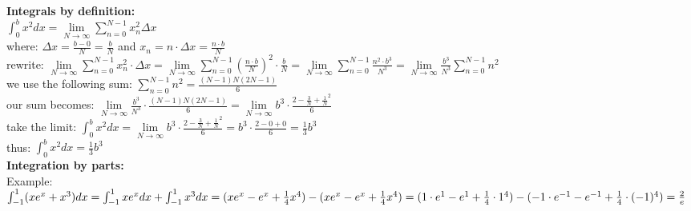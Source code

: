 \documentclass[12pt,a4paper]{report}
\begin{document}
	\textbf{Integrals by definition:}\\
	$\int_{0}^{b} x^2dx = \lim\limits_{N \to \infty} \sum_{n = 0}^{N - 1} x^2_n \Delta x$\\
	where:
	$\Delta x = \frac{b - 0}{N} = \frac{b}{N}$ and $x_n = n \cdot \Delta x = \frac{n \cdot b}{N}$\\
	rewrite:
	$\lim\limits_{N \to \infty}\sum_{n = 0}^{N - 1} x^2_n \cdot \Delta x = \lim\limits_{N \to \infty} \sum_{n = 0}^{N - 1} (\frac{n \cdot b}{N})^2 \cdot \frac{b}{N} = \lim\limits_{N \to \infty} \sum_{n = 0}^{N - 1} \frac{n^2 \cdot b^3}{N^3} = \lim\limits_{N \to \infty} \frac{b^3}{N^3} \sum_{n = 0}^{N - 1} n^2$\\
	we use the following sum:
	$\sum_{n = 0}^{N - 1} n^2 = \frac{(N-1)N(2N-1)}{6}$\\
	our sum becomes:
	$\lim\limits_{N \to \infty} \frac{b^3}{N^3} \cdot \frac{(N -1) N (2N - 1)}{6} = \lim\limits_{N \to \infty} b^3 \cdot \frac{2 - \frac{3}{N} + \frac{1}{N}^2}{6}$\\
	take the limit:
	$\int_{0}^{b} x^2 dx = \lim\limits_{N \to \infty} b^3 \cdot \frac{2 - \frac{3}{N} + \frac{1}{N}^2}{6} = b^3 \cdot \frac{2 - 0 + 0}{6} = \frac{1}{3}b^3$\\
	thus: $\int_{0}^{b} x^2 dx = \frac{1}{3} b^3$\\

	\textbf{Integration by parts:}\\
	Example:\\
	$\int_{-1}^{1}(xe^{x}+x^{3})dx=\int_{-1}^{1}xe^{x}dx+\int_{-1}^{1}x^{3}dx\\
	=(xe^{x}-e^{x}+\frac{1}{4}x^{4})-(xe^{x}-e^{x}+\frac{1}{4}x^{4})\\
	=(1\cdot e^{1}-e^{1}+\frac{1}{4}\cdot 1^{4})-(-1\cdot e^{-1}-e^{-1}+\frac{1}{4}\cdot(-1)^{4})=\frac{2}{e}$
	
\end{document}
